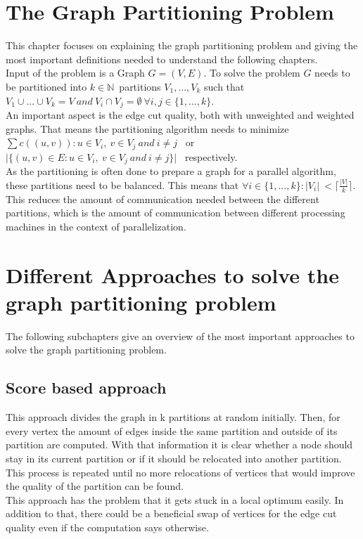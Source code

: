 \documentclass[acmsmall,nonacm,screen,review]{acmart}
\begin{document}
\section{The Graph Partitioning Problem}
This chapter focuses on explaining the graph partitioning problem and giving the most important definitions needed to understand the following chapters.\\
Input of the problem is a Graph $G = (V,E)$. To solve the problem $G$ needs to be partitioned into $k\in \mathbb{N}$\ partitions $V_{1},...,V_{k}$ such that $V_{1}\cup...\cup V_{k} = V\ and\ V_{i}\cap V_{j} = \emptyset\ \forall i,j\in \{1,...,k\}$.\\
An important aspect is the edge cut quality, both with unweighted and weighted graphs. That means the partitioning algorithm needs to minimize 
$\sum c((u,v)) : u\in V_{i},\ v\in V_{j}\ and\ i\neq j$ \ or $\vert \{(u,v)\in E : u\in V_{i},\ v\in V_{j}\ and\ i\neq j \}\vert$ \ respectively.\\
As the partitioning is often done to prepare a graph for a parallel algorithm, these partitions need to be balanced. This means that $\forall i\in \{1,...,k\} : \vert V_{i}\vert \ < \lceil \frac{\vert V \vert }{k} \rceil $. This reduces the amount of communication needed between the different partitions, which is the amount of communication between different processing machines in the context of parallelization.
\section{Different Approaches to solve the graph partitioning problem}
The following subchapters give an overview of the most important approaches to solve the graph partitioning problem.
\subsection{Score based approach}
This approach divides the graph in k partitions at random initially.
Then, for every vertex the amount of edges inside the same partition and outside of its partition are computed. With that information it is clear whether a node should stay in its current partition or if it should be relocated into another partition. This process is repeated until no more relocations of vertices that would improve the quality of the partition can be found.\\
This approach has the problem that it gets stuck in a local optimum easily. In addition to that, there could be a beneficial swap of vertices for the edge cut quality even if the computation says otherwise.
\end{document}
